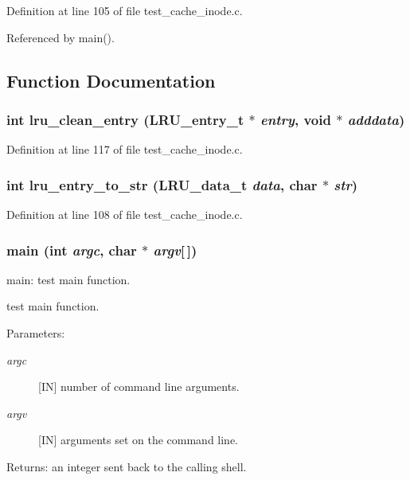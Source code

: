 Definition at line 105 of file test\_\-cache\_\-inode.c.

Referenced by main().

\subsection{Function Documentation}
\subsubsection{\setlength{\rightskip}{0pt plus 5cm}int lru\_\-clean\_\-entry (LRU\_\-entry\_\-t $\ast$ {\em entry}, void $\ast$ {\em adddata})}\label{test__cache__inode_8c_a3}




Definition at line 117 of file test\_\-cache\_\-inode.c.
\subsubsection{\setlength{\rightskip}{0pt plus 5cm}int lru\_\-entry\_\-to\_\-str (LRU\_\-data\_\-t {\em data}, char $\ast$ {\em str})}\label{test__cache__inode_8c_a2}




Definition at line 108 of file test\_\-cache\_\-inode.c.
\subsubsection{\setlength{\rightskip}{0pt plus 5cm}main (int {\em argc}, char $\ast$ {\em argv}[$\,$])}\label{test__cache__inode_8c_a4}


main: test main function.

test main function.

\begin{Desc}
\item[Parameters:]
\begin{description}
\item[{\em argc}][IN] number of command line arguments. \item[{\em argv}][IN] arguments set on the command line.\end{description}
\end{Desc}
\begin{Desc}
\item[Returns:]an integer sent back to the calling shell. \end{Desc}


